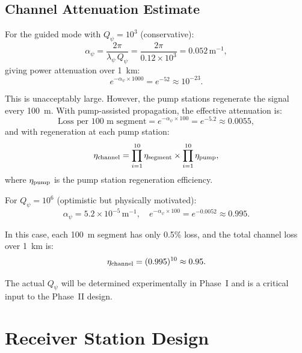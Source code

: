\documentclass[11pt,letterpaper]{article}
\begin{document}
\subsection{Channel Attenuation Estimate}

For the guided mode with $Q_\psi = 10^3$ (conservative):
\begin{equation}
\alpha_\psi = \frac{2\pi}{\lambda_\psi\,Q_\psi}
= \frac{2\pi}{0.12 \times 10^3} = 0.052\,\text{m}^{-1},
\end{equation}
giving power attenuation over 1~km:
\begin{equation}
e^{-\alpha_\psi \times 1000} = e^{-52} \approx 10^{-23}.
\end{equation}

This is unacceptably large. However, the pump stations regenerate
the signal every 100~m. With pump-assisted propagation, the effective
attenuation is:
\begin{equation}
\text{Loss per 100~m segment} = e^{-\alpha_\psi \times 100}
= e^{-5.2} \approx 0.0055,
\end{equation}
and with regeneration at each pump station:
\begin{equation}
\eta_{\rm channel} = \prod_{i=1}^{10}\eta_{\rm segment}
\times \prod_{i=1}^{10}\eta_{\rm pump},
\end{equation}
where $\eta_{\rm pump}$ is the pump station regeneration efficiency.

For $Q_\psi = 10^6$ (optimistic but physically motivated):
\begin{equation}
\alpha_\psi = 5.2 \times 10^{-5}\,\text{m}^{-1}, \quad
e^{-\alpha_\psi \times 100} = e^{-0.0052} \approx 0.995.
\end{equation}

In this case, each 100~m segment has only 0.5\% loss, and the
total channel loss over 1~km is:
\begin{equation}
\eta_{\rm channel} = (0.995)^{10} \approx 0.95.
\end{equation}

The actual $Q_\psi$ will be determined experimentally in Phase~I and
is a critical input to the Phase~II design.

\section{Receiver Station Design}
\end{document}
